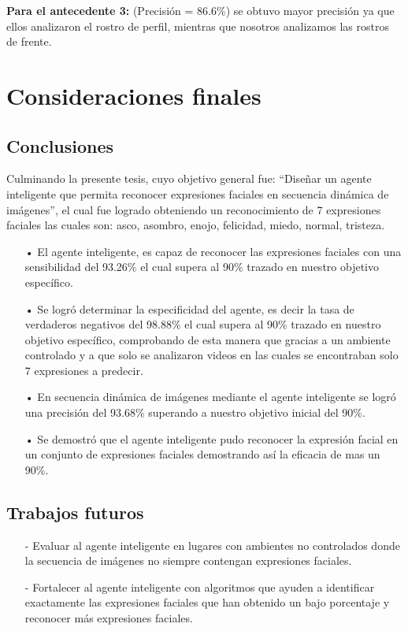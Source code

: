 {\bf Para el antecedente 3:} (Precisión = 86.6\%) se obtuvo mayor precisión ya que ellos analizaron el rostro de perfil, mientras que nosotros analizamos las rostros de frente.

\chapter{Consideraciones finales}

\section{Conclusiones}

Culminando la presente tesis, cuyo objetivo general fue: “Diseñar un agente inteligente que permita reconocer expresiones faciales en secuencia dinámica de imágenes”, el cual fue logrado obteniendo un reconocimiento de 7 expresiones faciales las cuales son: asco, asombro, enojo, felicidad, miedo, normal, tristeza.
\vskip 0.3cm

\begin{itemize}
\item[•] El agente inteligente, es capaz de reconocer las expresiones faciales con una sensibilidad del 93.26\% el cual supera al 90\% trazado en nuestro objetivo específico.
\item[•] Se logró determinar la especificidad del agente, es decir la tasa de verdaderos negativos del 98.88\% el cual supera al 90\% trazado en nuestro objetivo específico, comprobando de esta manera que gracias a un ambiente controlado y a que solo se analizaron videos en las cuales se encontraban solo 7 expresiones a predecir.
\item[•] En secuencia dinámica de imágenes mediante el agente inteligente se logró una precisión del 93.68\% superando a nuestro objetivo inicial del 90\%.
\item[•] Se demostró que el agente inteligente pudo reconocer la expresión facial en un conjunto de expresiones faciales demostrando así la eficacia de mas un 90\%.
\end{itemize}

\section{Trabajos futuros}

\begin{itemize}
\item[-] Evaluar al agente inteligente en lugares con ambientes no controlados donde la secuencia de imágenes no siempre contengan expresiones faciales.
\item[-] Fortalecer al agente inteligente con algoritmos que ayuden a identificar exactamente las expresiones faciales que han obtenido un bajo porcentaje y reconocer más expresiones faciales.
\end{itemize}


